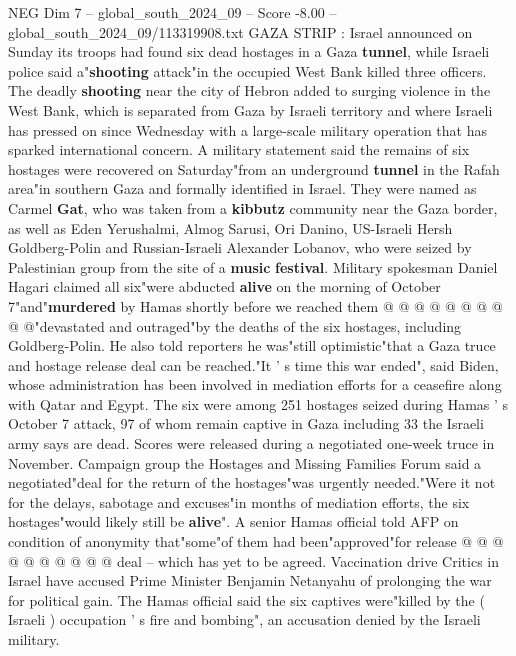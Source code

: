 \begin{textsample}{NEG Dim 7 – global\_south\_2024\_09 – Score -8.00 – global\_south\_2024\_09/113319908.txt}  \label{ex:f7_neg_175}
GAZA STRIP : Israel announced on Sunday its troops had found six dead hostages in a Gaza \textbf{tunnel}, while Israeli police said a"\textbf{shooting} attack"in the occupied West Bank killed three officers.
The deadly \textbf{shooting} near the city of Hebron added to surging violence in the West Bank, which is separated from Gaza by Israeli territory and where Israeli has pressed on since Wednesday with a large-scale military operation that has sparked international concern.
A military statement said the remains of six hostages were recovered on Saturday"from an underground \textbf{tunnel} in the Rafah area"in southern Gaza and formally identified in Israel.
They were named as Carmel \textbf{Gat}, who was taken from a \textbf{kibbutz} community near the Gaza border, as well as Eden Yerushalmi, Almog Sarusi, Ori Danino, US-Israeli Hersh Goldberg-Polin and Russian-Israeli Alexander Lobanov, who were seized by Palestinian group from the site of a \textbf{music} \textbf{festival}.
Military spokesman Daniel Hagari claimed all six"were abducted \textbf{alive} on the morning of October 7"and"\textbf{murdered} by Hamas shortly before we reached them @ @ @ @ @ @ @ @ @ @"devastated and outraged"by the deaths of the six hostages, including Goldberg-Polin.
He also told reporters he was"still optimistic"that a Gaza truce and hostage release deal can be reached."It ' s time this war ended", said Biden, whose administration has been involved in mediation efforts for a ceasefire along with Qatar and Egypt.
The six were among 251 hostages seized during Hamas ' s October 7 attack, 97 of whom remain captive in Gaza including 33 the Israeli army says are dead.
Scores were released during a negotiated one-week truce in November.
Campaign group the Hostages and Missing Families Forum said a negotiated"deal for the return of the hostages"was urgently needed."Were it not for the delays, sabotage and excuses"in months of mediation efforts, the six hostages"would likely still be \textbf{alive}".
A senior Hamas official told AFP on condition of anonymity that"some"of them had been"approved"for release @ @ @ @ @ @ @ @ @ @ deal -- which has yet to be agreed.
Vaccination drive Critics in Israel have accused Prime Minister Benjamin Netanyahu of prolonging the war for political gain.
The Hamas official said the six captives were"killed by the ( Israeli ) occupation ' s fire and bombing", an accusation denied by the Israeli military.

\end{textsample}
